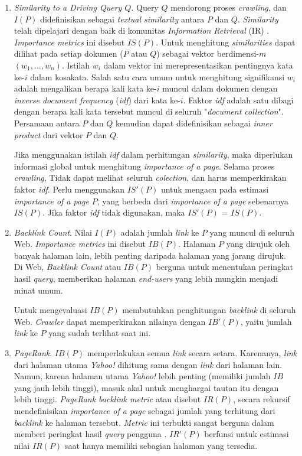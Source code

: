 \begin{enumerate}
	\item \emph{Similarity to a Driving Query $Q$}. Query $Q$ mendorong proses \emph{crawling}, dan $I(P)$ didefinisikan sebagai \emph{textual similarity} antara $P$ dan $Q$. \emph{Similarity} telah dipelajari dengan baik di komunitas \emph{Information Retrieval} (IR) \cite{salton1989automatic}. \emph{Importance metrics} ini disebut $IS(P)$. Untuk menghitung \emph{similarities} dapat dilihat pada setiap dokumen ($P$ atau $Q$) sebagai vektor berdimensi-$m$ $(w_{1}, ..., w_{n})$. Istilah $w_{i}$ dalam vektor ini merepresentasikan pentingnya kata ke-$i$ dalam kosakata. Salah satu cara umum untuk menghitung signifikansi $w_{i}$ adalah mengalikan berapa kali kata ke-$i$ muncul dalam dokumen dengan \emph{inverse document frequency} (\emph{idf}) dari kata ke-$i$. Faktor \emph{idf} adalah satu dibagi dengan berapa kali kata tersebut muncul di seluruh "\emph{document
	collection}". Persamaan antara $P$ dan $Q$ kemudian dapat didefinisikan sebagai \emph{inner product} dari vektor $P$ dan $Q$.

	Jika menggunakan istilah \emph{idf} dalam perhitungan \emph{similarity}, maka diperlukan informasi global untuk menghitung \emph{importance of a page}. Selama proses \emph{crawling}, Tidak dapat melihat seluruh \emph{colection}, dan harus memperkirakan faktor \emph{idf}. Perlu menggunakan $IS'(P)$ untuk mengacu pada estimasi \emph{importance of a page} $P$, yang berbeda dari \emph{importance of a page} sebenarnya $IS(P)$. Jika faktor \emph{idf} tidak digunakan, maka $IS'(P)$ = $IS(P)$.
	
	\item \emph{Backlink Count}. Nilai $I(P)$ adalah jumlah \emph{link} ke $P$ yang muncul di seluruh Web. \emph{Importance metrics} ini disebut $IB(P)$. Halaman $P$ yang dirujuk oleh banyak halaman lain, lebih penting daripada halaman yang jarang dirujuk. Di Web, \emph{Backlink Count} atau $IB(P)$ berguna untuk menentukan peringkat hasil \emph{query}, memberikan halaman \emph{end-users} yang lebih mungkin menjadi minat umum.
	
	Untuk mengevaluasi $IB(P)$ membutuhkan penghitungan \emph{backlink} di seluruh Web. \emph{Crawler} dapat memperkirakan nilainya dengan $IB'(P)$, yaitu jumlah \emph{link} ke $P$ yang sudah terlihat saat ini.
	
	\item \emph{PageRank}. $IB(P)$ memperlakukan semua \emph{link} secara setara. Karenanya, \emph{link} dari halaman utama \emph{Yahoo!} dihitung sama dengan \emph{link} dari halaman lain. Namun, karena halaman utama \emph{Yahoo!} lebih penting (memiliki jumlah $IB$ yang jauh lebih tinggi), masuk akal untuk menghargai tautan itu dengan lebih tinggi. \emph{PageRank backlink metric} atau disebut $IR(P)$, secara rekursif mendefinisikan \emph{importance of a page} sebagai jumlah yang terhitung dari \emph{backlink} ke halaman tersebut. \emph{Metric} ini terbukti sangat berguna dalam memberi peringkat hasil \emph{query} pengguna \cite{page1999pagerank}. $IR'(P)$ berfunsi untuk estimasi nilai $IR(P)$ saat hanya memiliki sebagian halaman yang tersedia.
	

\end{enumerate}
